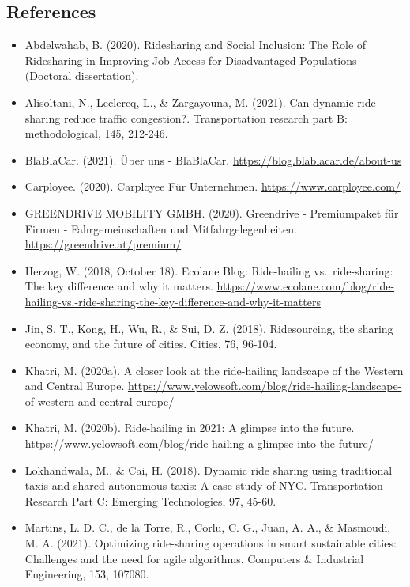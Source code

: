\documentclass[
]{book}
\providecommand{\tightlist}{%
  \setlength{\itemsep}{0pt}\setlength{\parskip}{0pt}}
\begin{document}
\hypertarget{references-34}{%
\subsection*{References}\label{references-34}}

\begin{itemize}
\tightlist
\item
  Abdelwahab, B. (2020). Ridesharing and Social Inclusion: The Role of Ridesharing in Improving Job Access for Disadvantaged Populations (Doctoral dissertation).
\item
  Alisoltani, N., Leclercq, L., \& Zargayouna, M. (2021). Can dynamic ride-sharing reduce traffic congestion?. Transportation research part B: methodological, 145, 212-246.
\item
  BlaBlaCar. (2021). Über uns - BlaBlaCar. \url{https://blog.blablacar.de/about-us}
\item
  Carployee. (2020). Carployee \textbar{} Für Unternehmen. \url{https://www.carployee.com/}
\item
  GREENDRIVE MOBILITY GMBH. (2020). Greendrive - Premiumpaket für Firmen - Fahrgemeinschaften und Mitfahrgelegenheiten. \url{https://greendrive.at/premium/}
\item
  Herzog, W. (2018, October 18). Ecolane Blog: Ride-hailing vs.~ride-sharing: The key difference and why it matters. \url{https://www.ecolane.com/blog/ride-hailing-vs.-ride-sharing-the-key-difference-and-why-it-matters}
\item
  Jin, S. T., Kong, H., Wu, R., \& Sui, D. Z. (2018). Ridesourcing, the sharing economy, and the future of cities. Cities, 76, 96-104.
\item
  Khatri, M. (2020a). A closer look at the ride-hailing landscape of the Western and Central Europe. \url{https://www.yelowsoft.com/blog/ride-hailing-landscape-of-western-and-central-europe/}
\item
  Khatri, M. (2020b). Ride-hailing in 2021: A glimpse into the future. \url{https://www.yelowsoft.com/blog/ride-hailing-a-glimpse-into-the-future/}
\item
  Lokhandwala, M., \& Cai, H. (2018). Dynamic ride sharing using traditional taxis and shared autonomous taxis: A case study of NYC. Transportation Research Part C: Emerging Technologies, 97, 45-60.
\item
  Martins, L. D. C., de la Torre, R., Corlu, C. G., Juan, A. A., \& Masmoudi, M. A. (2021). Optimizing ride-sharing operations in smart sustainable cities: Challenges and the need for agile algorithms. Computers \& Industrial Engineering, 153, 107080.

\end{itemize}
\end{document}
